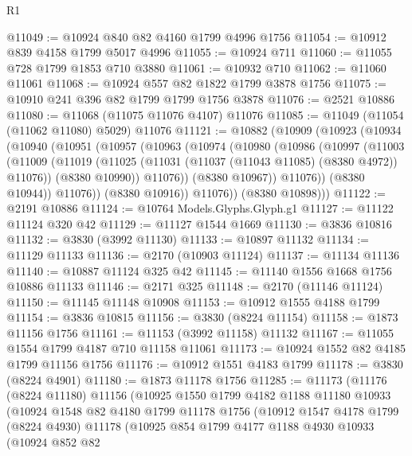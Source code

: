 \begin{lexlean}{R1}
\begin{coremodule}
@11049 := @10924 @840 @82 @4160 @1799 @4996 @1756
@11054 := @10912 @839 @4158 @1799 @5017 @4996
@11055 := @10924 @711
@11060 := @11055 @728 @1799 @1853 @710 @3880
@11061 := @10932 @710
@11062 := @11060 @11061
@11068 := @10924 @557 @82 @1822 @1799 @3878 @1756
@11075 := @10910 @241 @396 @82 @1799 @1799 @1756 @3878
@11076 := @2521 @10886
@11080 := @11068 (@11075 @11076 @4107) @11076
@11085 := @11049 (@11054 (@11062 @11080) @5029) @11076
@11121 := @10882
    (@10909
      (@10923
        (@10934
          (@10940
            (@10951
              (@10957
                (@10963
                  (@10974
                    (@10980
                      (@10986
                        (@10997
                          (@11003
                            (@11009
                              (@11019
                                (@11025 (@11031 (@11037 (@11043 @11085) (@8380 @4972)) @11076))
                                (@8380 @10990))
                              @11076))
                          (@8380 @10967))
                        @11076))
                    (@8380 @10944))
                  @11076))
              (@8380 @10916))
            @11076))
        (@8380 @10898)))
@11122 := @2191 @10886
@11124 := @10764 Models.Glyphs.Glyph.g1
@11127 := @11122 @11124 @320 @42
@11129 := @11127 @1544 @1669
@11130 := @3836 @10816
@11132 := @3830 (@3992 @11130)
@11133 := @10897 @11132
@11134 := @11129 @11133
@11136 := @2170 (@10903 @11124)
@11137 := @11134 @11136
@11140 := @10887 @11124 @325 @42
@11145 := @11140 @1556 @1668 @1756 @10886 @11133
@11146 := @2171 @325
@11148 := @2170 (@11146 @11124)
@11150 := @11145 @11148 @10908
@11153 := @10912 @1555 @4188 @1799
@11154 := @3836 @10815
@11156 := @3830 (@8224 @11154)
@11158 := @1873 @11156 @1756
@11161 := @11153 (@3992 @11158) @11132
@11167 := @11055 @1554 @1799 @4187 @710 @11158 @11061
@11173 := @10924 @1552 @82 @4185 @1799 @11156 @1756
@11176 := @10912 @1551 @4183 @1799
@11178 := @3830 (@8224 @4901)
@11180 := @1873 @11178 @1756
@11285 := @11173
    (@11176
      (@8224 @11180)
      @11156
      (@10925
        @1550
        @1799
        @4182
        @1188
        @11180
        @10933
        (@10924
          @1548
          @82
          @4180
          @1799
          @11178
          @1756
          (@10912
            @1547
            @4178
            @1799
            (@8224 @4930)
            @11178
            (@10925
              @854
              @1799
              @4177
              @1188
              @4930
              @10933
              (@10924
                @852
                @82

\end{coremodule}
\end{lexlean}
